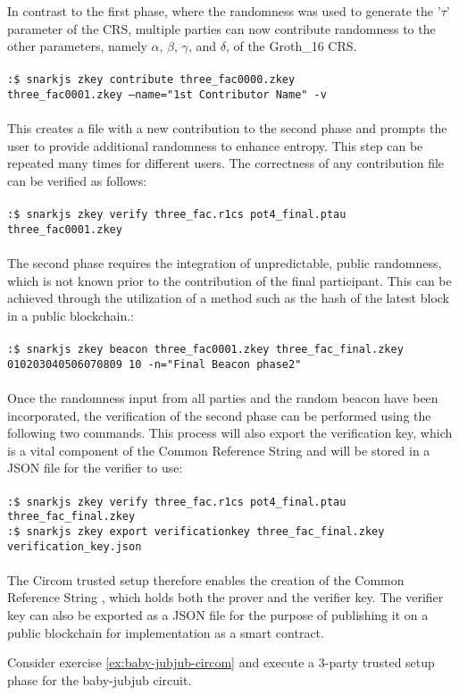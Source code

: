 \begin{example}
In contrast to the first phase, where the randomness was used to generate the '$\tau$' parameter of the CRS, multiple parties can now contribute randomness to the other parameters, namely $\alpha$, $\beta$, $\gamma$, and $\delta$, of the Groth\_16 CRS.
\\
\\
\texttt{:\$ snarkjs zkey contribute three\_fac0000.zkey \\ three\_fac0001.zkey --name="1st Contributor Name" -v}
\\
\\
This  creates a file with a new contribution to the second phase and prompts the user to provide additional randomness to enhance entropy. This step can be repeated many times for different users. The correctness of any contribution file can be verified as follows:
\\
\\
\texttt{:\$ snarkjs zkey verify three\_fac.r1cs pot4\_final.ptau \\ three\_fac0001.zkey}
\\
\\
The second phase requires the integration of unpredictable, public randomness, which is not known prior to the contribution of the final participant. This can be achieved through the utilization of a method such as the hash of the latest block in a public blockchain.:
\\
\\
\texttt{:\$ snarkjs zkey beacon three\_fac0001.zkey three\_fac\_final.zkey \\
010203040506070809 10 -n="Final Beacon phase2"}
\\
\\
Once the randomness input from all parties and the random beacon have been incorporated, the verification of the second phase can be performed using the following two commands. This process will also export the verification key, which is a vital component of the Common Reference String and will be stored in a JSON file for the verifier to use: 
\\
\\
\texttt{:\$ snarkjs zkey verify three\_fac.r1cs pot4\_final.ptau \\ three\_fac\_final.zkey}\\
\texttt{:\$ snarkjs zkey export verificationkey three\_fac\_final.zkey \\ verification\_key.json}
\\
\\
The Circom trusted setup therefore enables the creation of the Common Reference String , which holds both the prover and the verifier key. The verifier key can also be exported as a JSON file  for the purpose of publishing it on a public blockchain for implementation as a smart contract.
\end{example}
\begin{exercise} 
\label{ex:baby-jubjub-circom-setupt}
Consider exercise \ref{ex:baby-jubjub-circom} and execute a 3-party trusted setup phase for the baby-jubjub circuit.
\end{exercise}


